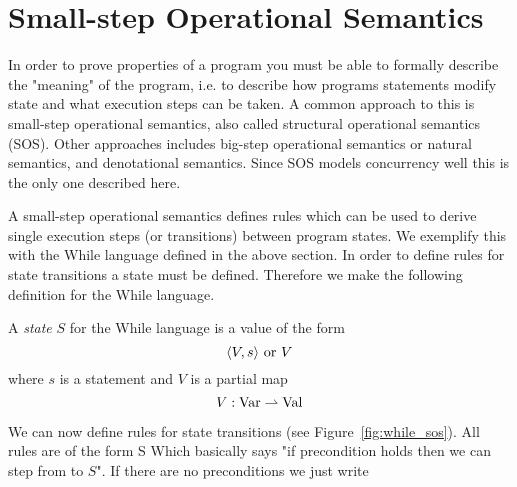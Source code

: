 \section{Small-step Operational Semantics} \label{sec:language_semantics}

In order to prove properties of a program you must be able to formally describe
the "meaning" of the program, i.e. to describe how programs statements modify
state and what execution steps can be taken. A common approach to this is
small-step operational semantics, also called structural operational semantics
(SOS). Other approaches includes big-step operational semantics or natural
semantics, and denotational semantics. Since SOS models concurrency well this is
the only one described here.

A small-step operational semantics defines rules which can be used to derive
single execution steps (or transitions) between program states. We exemplify
this with the While language defined in the above section. In order to define
rules for state transitions a state must be defined. Therefore we make the
following definition for the While language.

\begin{definition}
  A \emph{state} $S$ for the While language is a value of the form
  \begin{equation*}
    \langle V, s \rangle \text{ or } V
  \end{equation*}
  where $s$ is a statement and $V$ is a partial map
  \begin{equation*}
    V: \mbox{$\mathrm{Var}$} \rightharpoonup \mbox{$\mathrm{Val}$}
  \end{equation*}
\end{definition}

We can now define rules for state transitions (see Figure~\ref{fig:while_sos}).
All rules are of the form
{ \rightarrow S}
Which basically says "if precondition holds then we can step from 
to $S$".  If there are no preconditions we just write


